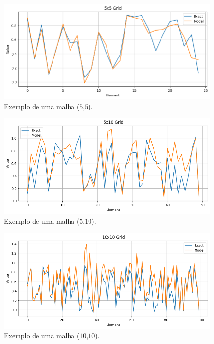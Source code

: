 \documentclass[final,5p]{elsarticle}
\numberwithin{equation}{section}
\begin{document}
    \begin{figure}[hbt!]
        \centering
        \includegraphics[width=0.85\columnwidth]{./fig/5x5.png}
        \caption{Exemplo de uma malha ($5$,$5$).}\label{fig:5x5}
    \end{figure}

    \begin{figure}[hbt!]
        \centering
        \includegraphics[width=0.85\columnwidth]{./fig/5x10.png}
        \caption{Exemplo de uma malha ($5$,$10$).}\label{fig:5x10}
    \end{figure}


    \begin{figure}[hbt!]
        \centering
        \includegraphics[width=0.85\columnwidth]{./fig/10x10.png}
        \caption{Exemplo de uma malha ($10$,$10$).}\label{fig:10x10}
    \end{figure}
\end{document}

